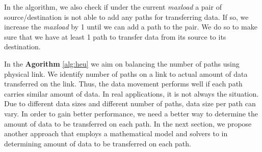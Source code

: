 In the algorithm, we also check if under the current \textit{maxload} a pair of source/destination is not able to add any paths for transferring data. If so, we increase the \textit{maxload} by 1 until we can add a path to the pair. We do so to make sure that we have at least 1 path to transfer data from its source to its destination.

In the \textbf{Agorithm} \ref{alg:heu} we aim on balancing the number of paths using physical link. We identify number of paths on a link to actual amount of data transferred on the link.  Thus, the data movement performs well if each path carries similar amount of data. In real applications, it is not always the situation. Due to different data sizes and different number of paths, data size per path can vary. In order to gain better performance, we need a better way to determine the amount of data to be transferred on each path. In the next section, we propose another approach that employs a mathematical model and solvers to in determining  amount of data to be transferred on each path.
